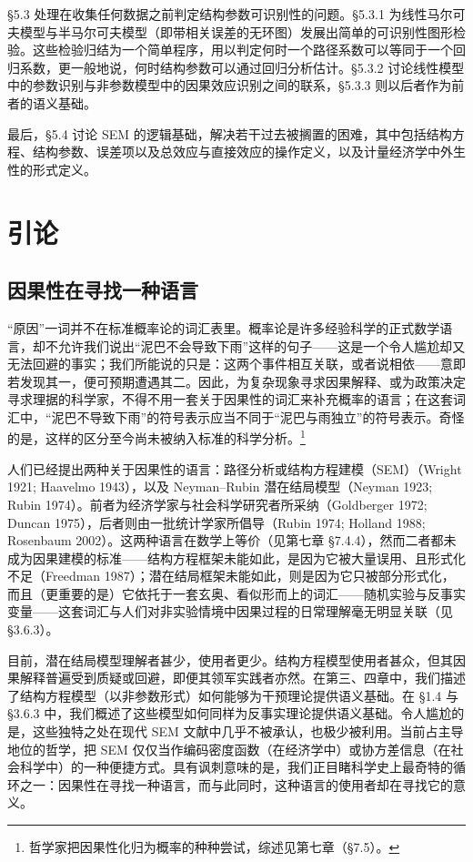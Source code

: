 \S 5.3 处理在收集任何数据之前判定结构参数可识别性的问题。\S 5.3.1 为线性马尔可夫模型与半马尔可夫模型（即带相关误差的无环图）发展出简单的可识别性图形检验。这些检验归结为一个简单程序，用以判定何时一个路径系数可以等同于一个回归系数，更一般地说，何时结构参数可以通过回归分析估计。\S 5.3.2 讨论线性模型中的参数识别与非参数模型中的因果效应识别之间的联系，\S 5.3.3 则以后者作为前者的语义基础。

最后，\S 5.4 讨论 SEM 的逻辑基础，解决若干过去被搁置的困难，其中包括结构方程、结构参数、误差项以及总效应与直接效应的操作定义，以及计量经济学中外生性的形式定义。

\section{引论}

\subsection{因果性在寻找一种语言}

“原因”一词并不在标准概率论的词汇表里。概率论是许多经验科学的正式数学语言，却不允许我们说出“泥巴不会导致下雨”这样的句子——这是一个令人尴尬却又无法回避的事实；我们所能说的只是：这两个事件相互关联，或者说相依——意即若发现其一，便可预期遭遇其二。因此，为复杂现象寻求因果解释、或为政策决定寻求理据的科学家，不得不用一套关于因果性的词汇来补充概率的语言；在这套词汇中，“泥巴不导致下雨”的符号表示应当不同于“泥巴与雨独立”的符号表示。奇怪的是，这样的区分至今尚未被纳入标准的科学分析。\footnote{哲学家把因果性化归为概率的种种尝试，综述见第七章（\S 7.5）。}

人们已经提出两种关于因果性的语言：路径分析或结构方程建模（SEM）（Wright 1921; Haavelmo 1943），以及 Neyman–Rubin 潜在结局模型（Neyman 1923; Rubin 1974）。前者为经济学家与社会科学研究者所采纳（Goldberger 1972; Duncan 1975），后者则由一批统计学家所倡导（Rubin 1974; Holland 1988; Rosenbaum 2002）。这两种语言在数学上等价（见第七章 \S 7.4.4），然而二者都未成为因果建模的标准——结构方程框架未能如此，是因为它被大量误用、且形式化不足（Freedman 1987）；潜在结局框架未能如此，则是因为它只被部分形式化，而且（更重要的是）它依托于一套玄奥、看似形而上的词汇——随机实验与反事实变量——这套词汇与人们对非实验情境中因果过程的日常理解毫无明显关联（见 \S 3.6.3）。

目前，潜在结局模型理解者甚少，使用者更少。结构方程模型使用者甚众，但其因果解释普遍受到质疑或回避，即便其领军实践者亦然。在第三、四章中，我们描述了结构方程模型（以非参数形式）如何能够为干预理论提供语义基础。在 \S 1.4 与 \S 3.6.3 中，我们概述了这些模型如何同样为反事实理论提供语义基础。令人尴尬的是，这些独特之处在现代 SEM 文献中几乎不被承认，也极少被利用。当前占主导地位的哲学，把 SEM 仅仅当作编码密度函数（在经济学中）或协方差信息（在社会科学中）的一种便捷方式。具有讽刺意味的是，我们正目睹科学史上最奇特的循环之一：因果性在寻找一种语言，而与此同时，这种语言的使用者却在寻找它的意义。

